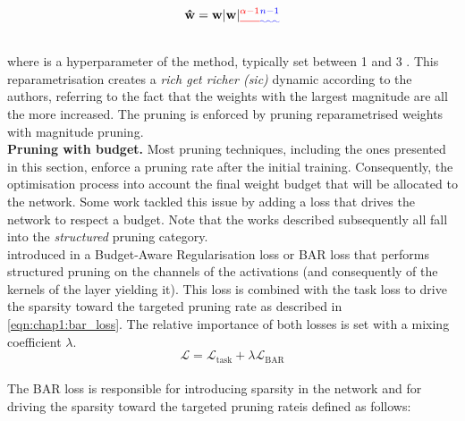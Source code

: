 \begin{equation}
  \label{eqn:chap1:power_propagation}
  \mathbf{\hat{w}} = \mathbf{w} |\mathbf{w}|\DIFdelbegin \DIFdel{^{\alpha-1}
}\DIFdelend \DIFaddbegin \DIFadd{^{n-1}
}\DIFaddend \end{equation}\\

\noindent where \DIFdelbegin \DIFdel{$\alpha$ }\DIFdelend \DIFaddbegin {}\DIFaddend is a hyperparameter of the method, typically set
between 1 and 3 \cite{powerprop}. This reparametrisation
creates a \emph{rich get richer (sic)} dynamic according to the authors,
referring to the fact that the weights with the largest magnitude are all the
more increased. The pruning is enforced by pruning reparametrised weights with
magnitude pruning.\\


\noindent \textbf{Pruning with budget.} Most pruning techniques, including the
ones presented in this section, enforce a pruning rate after the initial
training. Consequently, the optimisation process \DIFdelbegin {}\DIFdelend \DIFaddbegin {}\DIFaddend into account the
final weight budget that will be allocated to the network. Some work tackled
this issue by adding a loss that drives the network to respect a budget. Note
that the works described subsequently all fall into the \emph{structured}
pruning category.\\ 

\citeauthor{lemaire2019structured} introduced in \cite{lemaire2019structured} a
Budget-Aware Regularisation loss or BAR loss that performs structured pruning on
the channels of the activations (and consequently of the kernels of the layer
yielding it). This loss is combined with the task loss to drive the sparsity
toward the targeted pruning rate as described in \cref{eqn:chap1:bar_loss}. The
relative importance of both losses is set with a \DIFaddbegin {}\DIFaddend mixing
coefficient $\lambda$.\\

\begin{equation}
  \label{eqn:chap1:bar_loss}
  \mathcal{L} = \mathcal{L}_{\text{task}} + \lambda \mathcal{L}_{\text{BAR}}
\end{equation}\\

\noindent The BAR loss is responsible for introducing sparsity in the network
\DIFdelbegin {}\DIFdelend and for driving the sparsity toward the targeted pruning rate\DIFdelbegin {}\DIFdelend \DIFaddbegin {}\DIFaddend is defined as
follows:\\ 

